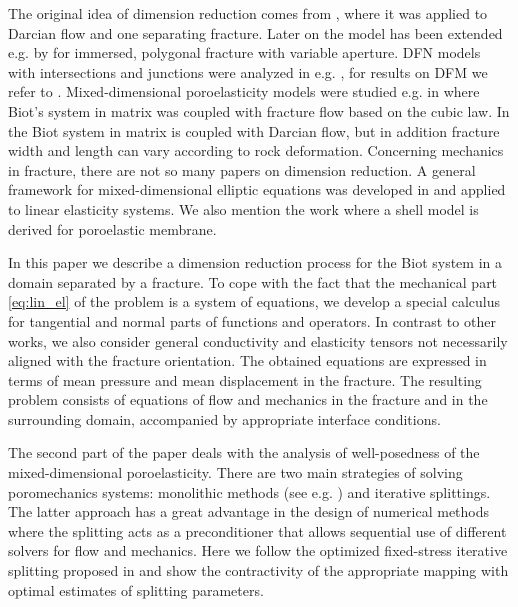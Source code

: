 \documentclass[a4paper]{article}
\numberwithin{equation}{section}
\begin{document}
The original idea of dimension reduction comes from \cite{martin_modeling_2005}, where it was applied to Darcian flow and one separating fracture.
Later on the model has been extended e.g. by \cite{angot2009asymptotic} for immersed, polygonal fracture with variable aperture.
DFN models with intersections and junctions were analyzed in e.g. \cite{maryska2005numerical,pichot2012generalized,formaggia2014reduced}, for results on DFM we refer to \cite{schwenck2015dimensionally}.
% 
Mixed-dimensional poroelasticity models were studied e.g. in \cite{ganis2014modeling} where Biot's system in matrix was coupled with fracture flow based on the cubic law.
In \cite{hanowski2018hydromechanical} the Biot system in matrix is coupled with Darcian flow, but in addition fracture width and length can vary according to rock deformation.
Concerning mechanics in fracture, there are not so many papers on dimension reduction.
A general framework for mixed-dimensional elliptic equations was developed in \cite{boon2017functional,boon2019stable} and applied to linear elasticity systems.
We also mention the work \cite{mikelic2019derivation} where a shell model is derived for poroelastic membrane.

In this paper we describe a dimension reduction process for the Biot system in a domain separated by a fracture.
To cope with the fact that the mechanical part \eqref{eq:lin_el} of the problem is a system of equations, we develop a special calculus for tangential and normal parts of functions and operators.
In contrast to other works, we also consider general conductivity and elasticity tensors not necessarily aligned with the fracture orientation.
The obtained equations are expressed in terms of mean pressure and mean displacement in the fracture.
The resulting problem consists of equations of flow and mechanics in the fracture and in the surrounding domain, accompanied by appropriate interface conditions.

The second part of the paper deals with the analysis of well-posedness of the mixed-dimensional poroelasticity.
There are two main strategies of solving poromechanics systems: monolithic methods (see e.g. \cite{showalter2000diffusion,zenisek1984existence}) and iterative splittings.
The latter approach has a great advantage in the design of numerical methods where the splitting acts as a preconditioner \cite{white2016block} that allows sequential use of different solvers for flow and mechanics.
Here we follow the optimized fixed-stress iterative splitting proposed in \cite{mikelic2013convergence} and show the contractivity of the appropriate mapping with optimal estimates of splitting parameters.
\end{document}
